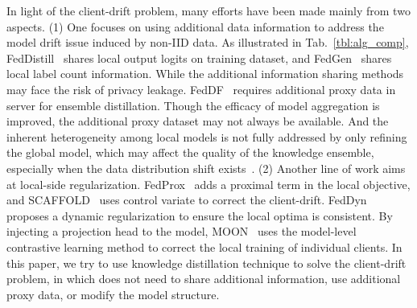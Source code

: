 \documentclass{article} %
\begin{document}
In light of the client-drift problem, many efforts have been made mainly from two aspects. (1) One focuses on using additional data information to address the model drift issue induced by non-IID data. As illustrated in Tab.~\ref{tbl:alg_comp}, FedDistill~\citep{seo2020federated} shares local output logits on training dataset, and FedGen~\citep{zhu2021data} shares local label count information. While the additional information sharing methods may face the risk of privacy leakage. FedDF~\citep{lin2020ensemble} requires additional proxy data in server for ensemble distillation. Though the efficacy of model aggregation is improved, the additional proxy dataset may not always be available. And the inherent heterogeneity among local models is not fully addressed by only refining the global model, which may affect the quality of the knowledge ensemble, especially when the data distribution shift exists~\citep{khoussainov2005ensembles}.  (2) Another line of work aims at local-side regularization. FedProx~\citep{li2018federated} adds a proximal term in the local objective, and SCAFFOLD~\citep{karimireddy2019scaffold} uses control variate to correct the client-drift. FedDyn~\citep{acar2020federated} proposes a dynamic regularization to ensure the local optima is consistent. By injecting a projection head to the model, MOON~\citep{li2021model} uses the model-level contrastive learning method to correct the local training of individual clients.
In this paper, we try to use knowledge distillation technique to solve the client-drift problem, in which does not need to share additional information, use additional proxy data, or modify the model structure.
\end{document}
